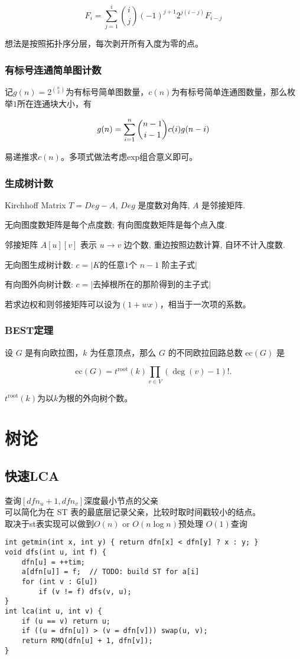 \documentclass[twoside]{article}
\begin{document}
$$
F_i=\sum_{j=1}^i \binom{i}{j}(-1)^{j+1}2^{j(i-j)}F_{i-j}
$$

想法是按照拓扑序分层，每次剥开所有入度为零的点。

\subsubsection{有标号连通简单图计数}

记$g(n)=2^{\binom n2}$为有标号简单图数量，$c(n)$为有标号简单连通图数量，那么枚举$1$所在连通块大小，有

$$
g(n) = \sum_{i=1}^n \dbinom{n-1}{i-1}c(i)g(n-i)
$$

易递推求$c(n)$。多项式做法考虑exp组合意义即可。

\subsubsection{生成树计数}
Kirchhoff Matrix $T = Deg - A$, $Deg$ 是度数对角阵, $A$ 是邻接矩阵. 

无向图度数矩阵是每个点度数; 有向图度数矩阵是每个点入度.

邻接矩阵 $A[u][v]$ 表示 $u \to v$ 边个数, 重边按照边数计算, 自环不计入度数.

无向图生成树计数: $c = |K$的任意$1$个 $n-1$ 阶主子式$|$

有向图外向树计数: $c = |$去掉根所在的那阶得到的主子式$|$

若求边权和则邻接矩阵可以设为$(1+wx)$，相当于一次项的系数。

\subsubsection{BEST定理}
设 $G$ 是有向欧拉图，$k$ 为任意顶点，那么 $G$ 的不同欧拉回路总数 $\mathrm{ec}(G)$ 是

$$
\mathrm{ec}(G) = t^\mathrm{root}(k)\prod_{v\in V}(\deg (v) - 1)!.
$$

$t^\mathrm{root}(k)$为以$k$为根的外向树个数。\clearpage\section{树论}
\subsection{快速LCA}
\noindent 查询$[dfn_u + 1 , dfn_v]$深度最小节点的父亲\\
可以简化为在 ST 表的最底层记录父亲，比较时取时间戳较小的结点。\\
取决于st表实现可以做到$O(n)$ or $O(n\log n)$预处理 $O(1)$查询
\begin{lstlisting}
int getmin(int x, int y) { return dfn[x] < dfn[y] ? x : y; }
void dfs(int u, int f) {
	dfn[u] = ++tim;
	a[dfn[u]] = f;  // TODO: build ST for a[i]
	for (int v : G[u])
		if (v != f) dfs(v, u);
}
int lca(int u, int v) {
	if (u == v) return u;
	if ((u = dfn[u]) > (v = dfn[v])) swap(u, v);
	return RMQ(dfn[u] + 1, dfn[v]);
}\end{lstlisting}
\end{document}
